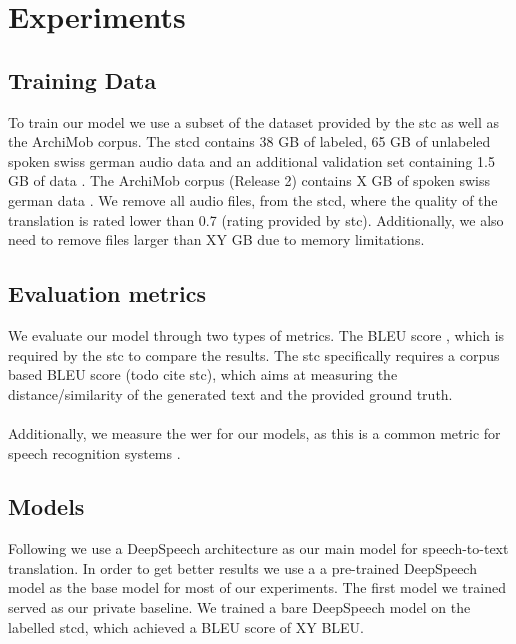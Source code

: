 \section{Experiments}

\subsection{Training Data}
To train our model we use a subset of the dataset provided by the \gls{stc} as well as the ArchiMob corpus. The \gls{stcd} contains 38 GB of labeled, 65 GB of unlabeled spoken swiss german audio data and an additional validation set
containing 1.5 GB of data \cite{stc2019}. The ArchiMob corpus (Release 2) contains X GB of spoken swiss german data \cite{archimob2016}. We remove all audio files, from the \gls{stcd}, where the quality of the translation
is rated lower than 0.7 (rating provided by \gls{stc}). Additionally, we also need to remove files larger than XY GB due to memory limitations.

\subsection{Evaluation metrics}
We evaluate our model through two types of metrics. The BLEU score \cite{Papineni2002BleuAM}, which is required by the \gls{stc} to compare the results. The \gls{stc} specifically requires a corpus
based BLEU score (todo cite stc), which aims at measuring the distance/similarity of the generated text and the provided ground truth.\\~\\Additionally, we measure the \gls{wer} for our models, as
this is a common metric for speech recognition systems \cite{Park2008AnEA}.


\subsection{Models}
Following  we use a DeepSpeech architecture \cite{Hannun2014DeepSS} as our main model for speech-to-text translation. In order to get better results we use a
a pre-trained DeepSpeech model \cite{DeepSpeechGerman090} as the base model for most of our experiments. The first model we trained served as our private baseline. We trained a bare DeepSpeech model
on the labelled \gls{stcd}, which achieved a BLEU score of XY BLEU.

